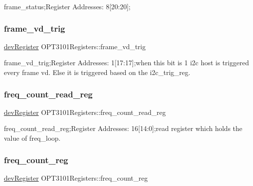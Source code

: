 frame\+\_\+status;Register Addresses\+: 8\mbox{[}20\+:20\mbox{]}; 

\mbox{\label{class_o_p_t3101_registers_a82583d9913fb9594494f5fb0a7736a5b}} 
\subsubsection{\texorpdfstring{frame\+\_\+vd\+\_\+trig}{frame\_vd\_trig}}
{\footnotesize\ttfamily \mbox{\hyperlink{classdev_register}{dev\+Register}} O\+P\+T3101\+Registers\+::frame\+\_\+vd\+\_\+trig}



frame\+\_\+vd\+\_\+trig;Register Addresses\+: 1\mbox{[}17\+:17\mbox{]};when this bit is \textquotesingle{}1\textquotesingle{} i2c host is triggered every frame vd. Else it is triggered based on the i2c\+\_\+trig\+\_\+reg. 

\mbox{\label{class_o_p_t3101_registers_a13c46fadc99502c2ad89f32cd563c78a}} 
\subsubsection{\texorpdfstring{freq\+\_\+count\+\_\+read\+\_\+reg}{freq\_count\_read\_reg}}
{\footnotesize\ttfamily \mbox{\hyperlink{classdev_register}{dev\+Register}} O\+P\+T3101\+Registers\+::freq\+\_\+count\+\_\+read\+\_\+reg}



freq\+\_\+count\+\_\+read\+\_\+reg;Register Addresses\+: 16\mbox{[}14\+:0\mbox{]};read register which holds the value of freq\+\_\+loop. 

\mbox{\label{class_o_p_t3101_registers_acbf519ef46a522fcd6d135ff241379dd}} 
\subsubsection{\texorpdfstring{freq\+\_\+count\+\_\+reg}{freq\_count\_reg}}
{\footnotesize\ttfamily \mbox{\hyperlink{classdev_register}{dev\+Register}} O\+P\+T3101\+Registers\+::freq\+\_\+count\+\_\+reg}



